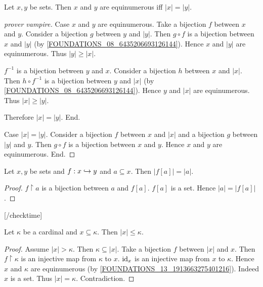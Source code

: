 \documentclass[10pt]{article}
\begin{document}
  \begin{forthel}
    \begin{proposition}
      Let $x, y$ be sets.
      Then $x$ and $y$ are equinumerous iff $|x| = |y|$.
    \end{proposition}
    \begin{proof}
      [prover vampire]

      Case $x$ and $y$ are equinumerous.
        Take a bijection $f$ between $x$ and $y$.
        Consider a bijection $g$ between $y$ and $|y|$.
        Then $g \circ f$ is a bijection between $x$ and $|y|$
        (by \cref{FOUNDATIONS_08_6435206693126144}).
        Hence $x$ and $|y|$ are equinumerous.
        Thus $|y| \geq |x|$.

        $f^{-1}$ is a bijection between $y$ and $x$.
        Consider a bijection $h$ between $x$ and $|x|$.
        Then $h \circ f^{-1}$ is a bijection between $y$ and $|x|$
        (by \cref{FOUNDATIONS_08_6435206693126144}).
        Hence $y$ and $|x|$ are equinumerous.
        Thus $|x| \geq |y|$.

        Therefore $|x| = |y|$.
      End.

      Case $|x| = |y|$.
        Consider a bijection $f$ between $x$ and $|x|$ and a bijection $g$
        between $|y|$ and $y$.
        Then $g \circ f$ is a bijection between $x$ and $y$.
        Hence $x$ and $y$ are equinumerous.
      End.
    \end{proof}
  \end{forthel}

  \begin{forthel}
    [checktime 2]

    \begin{proposition}
      Let $x, y$ be sets and $f : x \hookrightarrow y$ and $a \subseteq x$.
      Then $|f[a]| = |a|$.
    \end{proposition}
    \begin{proof}
      $f \restriction a$ is a bijection between $a$ and $f[a]$.
      $f[a]$ is a set.
      Hence $|a| = |f[a]|$.
    \end{proof}

    [/checktime]
  \end{forthel}

  \begin{forthel}
    \begin{proposition}
      Let $\kappa$ be a cardinal and $x \subseteq \kappa$.
      Then $|x| \leq \kappa$.
    \end{proposition}
    \begin{proof}
      Assume $|x| > \kappa$.
      Then $\kappa \subseteq |x|$.
      Take a bijection $f$ between $|x|$ and $x$.
      Then $f \restriction \kappa$ is an injective map from $\kappa$ to $x$.
      $\textrm{id}_{x}$ is an injective map from $x$ to $\kappa$.
      Hence $x$ and $\kappa$ are equinumerous (by
      \cref{FOUNDATIONS_13_1913663275401216}).
      Indeed $x$ is a set.
      Thus $|x| = \kappa$.
      Contradiction.
    \end{proof}
  \end{forthel}
\end{document}
